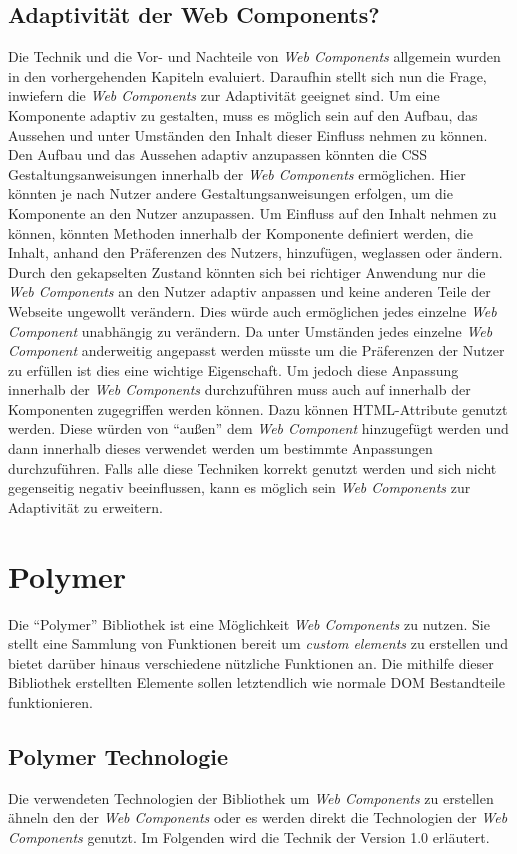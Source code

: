 \documentclass[12pt, paper=a4, bibtotoc, toc=listof, headsepline=true, numbers=endperiod]{scrreprt}
\begin{document}
	\section{Adaptivität der Web Components?}
	Die Technik und die Vor- und Nachteile von \emph{Web Components} allgemein wurden in den vorhergehenden Kapiteln evaluiert. Daraufhin stellt sich nun die Frage, inwiefern die \emph{Web Components} zur Adaptivität geeignet sind. Um eine Komponente adaptiv zu gestalten, muss es möglich sein auf den Aufbau, das Aussehen und unter Umständen den Inhalt dieser Einfluss nehmen zu können.
	\newline
	Den Aufbau und das Aussehen adaptiv anzupassen könnten die \ac{CSS} Gestaltungsanweisungen innerhalb der \emph{Web Components} ermöglichen. Hier könnten je nach Nutzer andere Gestaltungsanweisungen erfolgen, um die Komponente an den Nutzer anzupassen. Um Einfluss auf den Inhalt nehmen zu können, könnten Methoden innerhalb der Komponente definiert werden, die Inhalt, anhand den Präferenzen des Nutzers, hinzufügen, weglassen oder ändern. Durch den gekapselten Zustand könnten sich bei richtiger Anwendung nur die \emph{Web Components} an den Nutzer adaptiv anpassen und keine anderen Teile der Webseite ungewollt verändern. Dies würde auch ermöglichen jedes einzelne \emph{Web Component} unabhängig zu verändern. Da unter Umständen jedes einzelne \emph{Web Component} anderweitig angepasst werden müsste um die Präferenzen der Nutzer zu erfüllen ist dies eine wichtige Eigenschaft. Um jedoch diese Anpassung innerhalb der \emph{Web Components} durchzuführen muss auch auf innerhalb der Komponenten zugegriffen werden können. Dazu können HTML-Attribute genutzt werden. Diese würden von \enquote{außen} dem \emph{Web Component} hinzugefügt werden und dann innerhalb dieses verwendet werden um bestimmte Anpassungen durchzuführen. Falls alle diese Techniken korrekt genutzt werden und sich nicht gegenseitig negativ beeinflussen, kann es möglich sein \emph{Web Components} zur Adaptivität zu erweitern.
\chapter{Polymer}
Die \enquote{Polymer} Bibliothek ist eine Möglichkeit \emph{Web Components} zu nutzen. Sie stellt eine Sammlung von Funktionen bereit um \emph{custom elements} zu erstellen und bietet darüber hinaus verschiedene nützliche Funktionen an. Die mithilfe dieser Bibliothek erstellten Elemente sollen letztendlich wie normale \ac{DOM} Bestandteile funktionieren\cite{polymerFeaOve}.
	\section{Polymer Technologie} Die verwendeten Technologien der Bibliothek um \emph{Web Components} zu erstellen ähneln den der \emph{Web Components} oder es werden direkt die Technologien der \emph{Web Components} genutzt. Im Folgenden wird die Technik der Version 1.0 erläutert.
\end{document}
